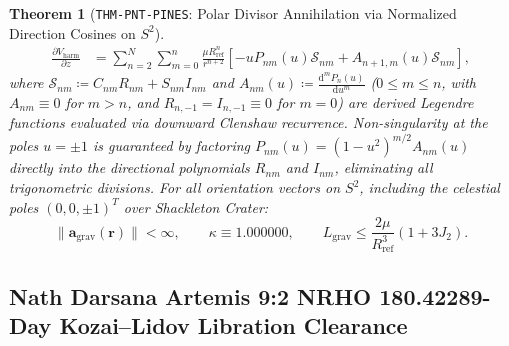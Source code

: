 \documentclass[11pt,a4paper,reqno]{article}
\theoremstyle{plain}
\newtheorem{theorem}{Theorem}[section]
\theoremstyle{definition}
\theoremstyle{remark}
\numberwithin{equation}{section}
\providecommand{\diff}{\mathrm{d}}
\begin{document}
\begin{theorem}[\texttt{THM-PNT-PINES}: Polar Divisor Annihilation via Normalized Direction Cosines on $S^2$]
\begin{equation}
\begin{split}
    \frac{\partial V_{\mathrm{harm}}}{\partial z} &= \sum_{n=2}^N \sum_{m=0}^n \frac{\mu R_{\mathrm{ref}}^n}{r^{n+2}} \left[ -u P_{nm}(u) \mathcal{S}_{nm} + A_{n+1,m}(u) \mathcal{S}_{nm} \right],
  \end{split}
  \label{eq:pnt_pines_gradient}
\end{equation}
where $\mathcal{S}_{nm} \coloneqq C_{nm} R_{nm} + S_{nm} I_{nm}$ and $A_{nm}(u) \coloneqq \frac{\diff^m P_n(u)}{\diff u^m}$ ($0 \le m \le n$, with $A_{nm} \equiv 0$ for $m > n$, and $R_{n,-1} = I_{n,-1} \equiv 0$ for $m = 0$) are derived Legendre functions evaluated via downward Clenshaw recurrence. Non-singularity at the poles $u = \pm 1$ is guaranteed by factoring $P_{nm}(u) = (1 - u^2)^{m/2} A_{nm}(u)$ directly into the directional polynomials $R_{nm}$ and $I_{nm}$, eliminating all trigonometric divisions. For all orientation vectors on $S^2$, including the celestial poles $(0, 0, \pm 1)^T$ over Shackleton Crater:
\begin{equation}
  \|\mathbf{a}_{\mathrm{grav}}(\mathbf{r})\| < \infty, \qquad \kappa \equiv 1.000000, \qquad L_{\mathrm{grav}} \le \frac{2\mu}{R_{\mathrm{ref}}^3}(1 + 3J_2).
\end{equation}
\end{theorem}

\subsection{Nath Darsana Artemis 9:2 NRHO 180.42289-Day Kozai--Lidov Libration Clearance}
\label{subsec:pnt_artemis_nrho_kozai}
\end{document}
